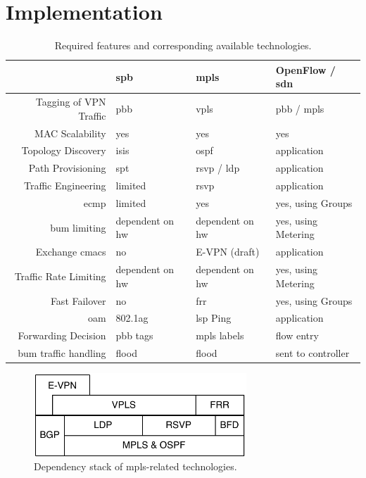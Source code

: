 \section{Implementation} %
\label{sec:implementation}


\begin{table}[h]
	\centering
	\begin{tabular}{r|lll}
	 & \acs{spb} & \acs{mpls} & OpenFlow / \acs{sdn}\\
	\hline
	Tagging of VPN Traffic & \acs{pbb} & \acs{vpls} & \acs{pbb} / \acs{mpls}\\
	MAC Scalability & yes & yes & yes\\
	Topology Discovery & \acs{isis} & \acs{ospf} & application\\
	Path Provisioning & \acs{spt} & \acs{rsvp} / \acs{ldp} & application\\
	Traffic Engineering & limited & \acs{rsvp} & application\\
	\ac{ecmp} & limited & yes & yes, using Groups\\
	\ac{bum} limiting & dependent on \acs{hw} & dependent on \acs{hw} & yes, using Metering\\
	Exchange \acsp{cmac} & no & E-VPN (draft) & application\\
	Traffic Rate Limiting & dependent on \acs{hw} & dependent on \acs{hw} & yes, using Metering\\
	Fast Failover & no & \acs{frr} & yes, using Groups\\
	\acs{oam} & 802.1ag & \acs{lsp} Ping & application\\
	\hline
	Forwarding Decision & \acs{pbb} tags & \acs{mpls} labels & flow entry \\
	\ac{bum} traffic handling & flood & flood & sent to controller\\
	\end{tabular}
	\caption{Required features and corresponding available technologies.}
	\label{tb:reqs}
\end{table}


\begin{figure}[!h]
	\centering
	\includegraphics[width=8cm]{./includes/mpls-stack.pdf}
	\caption{Dependency stack of \ac{mpls}-related technologies.}
	\label{fig:mpls-stack}
\end{figure}


